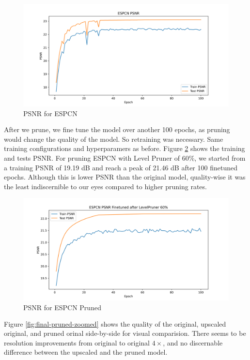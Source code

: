 \documentclass{article}
\begin{document}
\begin{figure}
	\centerline{\includegraphics[width=6in]{../final/figures/SuperResolutionTwitter_PSNR.png}}
	\caption{PSNR for ESPCN}
	\label{fig:psnr}
\end{figure}

After we prune, we fine tune the model over another 100 epochs, as pruning would change the quality of the model. So retraining was necessary. Same training configurations and hyperparamers as before.  Figure \ref{fig:psnr-pruned} shows the training and tests PSNR. For pruning ESPCN with Level Pruner of 60\%, we started from a training PSNR of 19.19 dB and reach a peak of 21.46 dB after 100 finetuned epochs. Although this is lower PSNR than the original model, quality-wise it was the least indiscernible to our eyes compared to higher pruning rates.

\begin{figure}
	\centerline{\includegraphics[width=6in]{../final/figures/SuperResolutionTwitter_PSNR_pruned.png}}
	\caption{PSNR for ESPCN Pruned}
	\label{fig:psnr-pruned}
\end{figure}


Figure \ref{fig:final-pruned-zoomed} shows the quality of the original, upscaled original, and pruned orinal side-by-side for visual comparision. There seems to be resolution improvements from original to original $4\times$, and no discernable difference between the upscaled and the pruned model.
\end{document}
